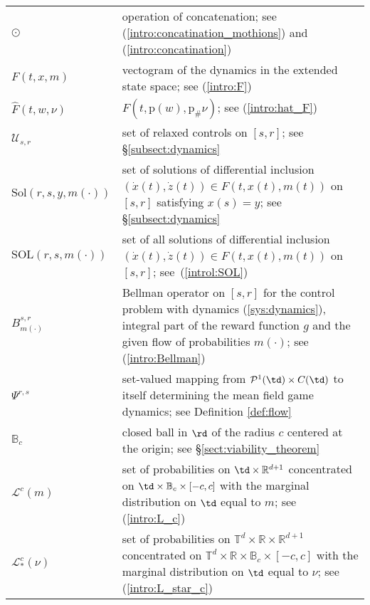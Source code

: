 \documentclass[a4paper,12pt]{article}
\newcommand{\rdp}{\mathbb{R}^{d+1}}
\newcommand{\tdr}{\mathbb{T}^{d}\times\mathbb{R}}
\begin{document}
\begin{longtable}{l p{12.0cm}}
	$\odot$ & operation of concatenation; see (\ref{intro:concatination_mothions}) and (\ref{intro:concatination})\\
	$F(t,x,m)$ & vectogram of the dynamics in the extended state space; see (\ref{intro:F})\\
	$\widehat{F}(t,w,\nu)$ & $F(t,\mathrm{p}(w),\mathrm{p}_\#\nu)$; see (\ref{intro:hat_F})\\
	$\mathcal{U}_{s,r}$ & set of relaxed controls on $[s,r]$; see \S\ref{subsect:dynamics}\\
	$\mathrm{Sol}(r,s,y,m(\cdot))$ & set of solutions of differential inclusion $(\dot{x}(t),\dot{z}(t))\in F(t,x(t),m(t))$ on $[s,r]$ satisfying  $x(s)=y$; see \S \ref{subsect:dynamics} \\
	$\mathrm{SOL}(r,s,m(\cdot))$ & set of all solutions of differential inclusion $(\dot{x}(t),\dot{z}(t))\in F(t,x(t),m(t))$ on $[s,r]$; see~(\ref{introl:SOL}) \\
	$B^{s,r}_{m(\cdot)}$ & Bellman operator on $[s,r]$ for the control problem with dynamics (\ref{sys:dynamics}), integral part of the  reward function $g$ and the given flow of probabilities $m(\cdot)$; see (\ref{intro:Bellman})\\
	$\Psi^{r,s}$ & set-valued mapping from $\mathcal{P}^1(\td)\times C(\td)$ to itself determining the mean field game dynamics; see Definition \ref{def:flow} \\
	$\mathbb{B}_c$  & closed ball in $\rd$ of the radius $c$ centered at the origin; see \S \ref{sect:viability_theorem}\\
	$\mathcal{L}^c(m)$ & set of probabilities on $\td\times\rdp$ concentrated on $\td\times\mathbb{B}_c\times [-c,c]$ with the marginal distribution on $\td$ equal to $m$; see (\ref{intro:L_c})\\
	$\mathcal{L}^c_*(\nu)$ & set of probabilities on $\tdr\times\rdp$ concentrated on $\tdr\times\mathbb{B}_c\times [-c,c]$ with the marginal distribution on $\td$ equal to $\nu$; see (\ref{intro:L_star_c})\\

\end{longtable}
\end{document}
